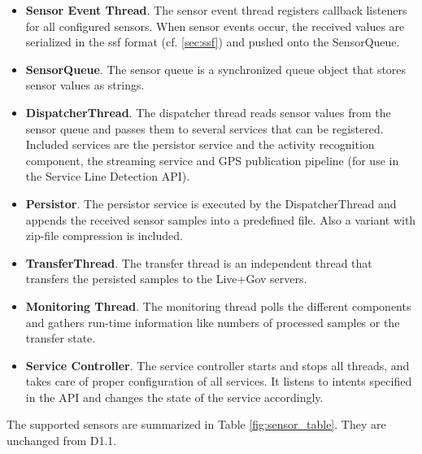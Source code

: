 \begin{itemize}
\item {\bf Sensor Event Thread}. The sensor event thread registers
  callback listeners for all configured sensors. When sensor events
  occur, the received values are serialized in the ssf
  format (cf. \ref{sec:ssf}) and pushed onto the SensorQueue.
\item {\bf SensorQueue}. The sensor queue is a synchronized queue
  object that stores sensor values as strings.
\item {\bf DispatcherThread}. The dispatcher thread reads sensor
  values from the sensor queue and passes them to several services
  that can be registered. Included services are the persistor service
  and the activity recognition component, the streaming service and GPS
  publication pipeline (for use in the Service Line Detection API).
\item {\bf Persistor}. The persistor service is executed by the
  DispatcherThread and appends the received sensor samples into a
  predefined file. Also a variant with zip-file compression is
  included.
\item {\bf TransferThread}. The transfer thread is an independent
  thread that transfers the persisted samples to the Live+Gov servers.
\item {\bf Monitoring Thread}. The monitoring thread polls the
  different components and gathers run-time information like numbers
  of processed samples or the transfer state.
\item {\bf Service Controller}. The service controller starts and
  stops all threads, and takes care of proper configuration of all
  services. It listens to intents specified in the API and changes the
  state of the service accordingly.
\end{itemize}

The supported sensors are summarized in Table
\ref{fig:sensor_table}. They are unchanged from D1.1.

